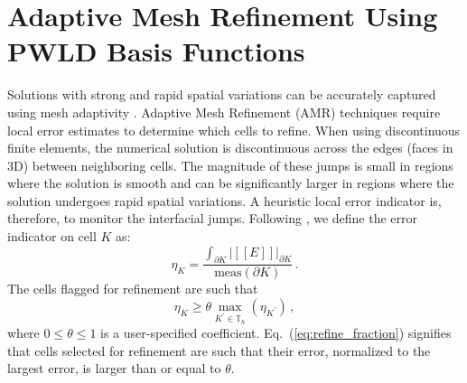 \documentclass[preprint,10pt]{elsarticle}
\newcommand{\jmp}[1]{[\![#1]\!]}                     %
\newcommand{\eqt}[1]{Eq.~(\ref{#1})}                     %
\begin{document}




\section{Adaptive Mesh Refinement Using PWLD Basis Functions} \label{sec:amr}

Solutions with strong and rapid spatial variations can be accurately captured using mesh adaptivity
\cite{Ainsworth2000}. Adaptive Mesh Refinement (AMR) techniques require local error estimates to determine
which cells to refine. When using discontinuous finite elements, the numerical solution is discontinuous
across the edges (faces in 3D) between neighboring cells. The magnitude of these jumps is 
small in regions where the solution is smooth and can be significantly larger in regions where
the solution undergoes rapid spatial variations. A heuristic local error indicator is, therefore, to
monitor the interfacial jumps. Following \cite{Leicht2008,Ragusa_Wang_JCP_2011}, we define 
the error indicator on cell $K$ as:
\begin{equation} \label{eq:error_indicator}
  \eta_K = \frac{\int_{\partial K} |\jmp{E}|_{\partial K}} {\text{meas}(\partial K)} \, .
\end{equation}  
%
The cells flagged for refinement are such that 
\begin{equation} \label{eq:refine_fraction}
  \eta_K \ge  \theta \max_{K^\prime \in \mathbb{T}_h} \left( \eta_{K^\prime} \right) \, ,
\end{equation}  
where $0 \le \theta \le 1$ is a user-specified coefficient. \eqt{eq:refine_fraction} signifies
that cells selected for refinement are such that their error, normalized to the largest error, 
is larger than or equal to $\theta$.
\end{document}
